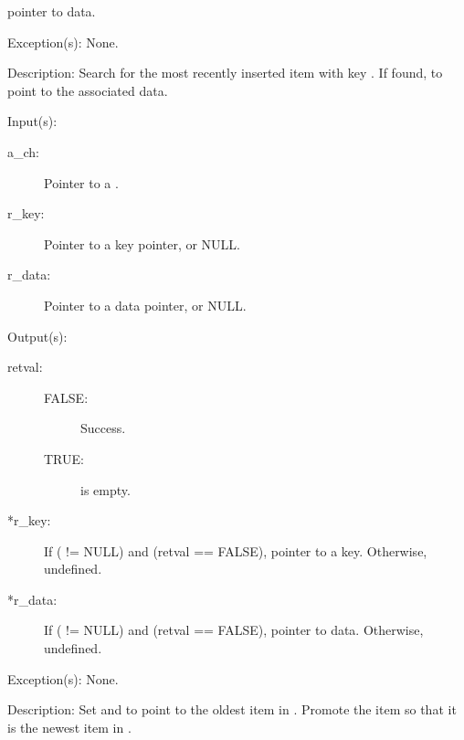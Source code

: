 \begin{capi}
\begin{capilist}
\begin{description}
			pointer to data.
		\end{description}
	\item[Exception(s): ] None.
	\item[Description: ]
		Search for the most recently inserted item with key
		.  If found,  to point to the
		associated data.
	\end{capilist}
\label{ch_get_iterate}
	\begin{capilist}
	\item[Input(s): ]
		\begin{description}\item[]
		\item[a\_ch: ]
			Pointer to a .
		\item[r\_key: ]
			Pointer to a key pointer, or NULL.
		\item[r\_data: ]
			Pointer to a data pointer, or NULL.
		\end{description}
	\item[Output(s): ]
		\begin{description}\item[]
		\item[retval: ]
			\begin{description}\item[]
			\item[FALSE: ]
				Success.
			\item[TRUE: ]
				 is empty.
			\end{description}
		\item[*r\_key: ]
			If ( != NULL) and (retval == FALSE),
			pointer to a key.  Otherwise, undefined.
		\item[*r\_data: ]
			If ( != NULL) and (retval == FALSE),
			pointer to data.  Otherwise, undefined.
		\end{description}
	\item[Exception(s): ] None.
	\item[Description: ]
		Set  and  to point to the oldest
		item in .  Promote the item so that it is the newest
		item in .
	\end{capilist}
\label{ch_remove_iterate}

\end{capi}
